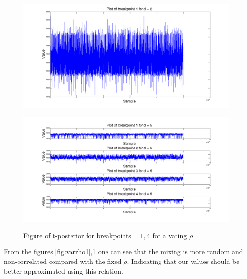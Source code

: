 \begin{figure}[H]

  \centering
\begin{minipage}{1\textwidth}
    \includegraphics[scale=0.28]{./Figures/varrho1.png}
  \label{fig:varrho1}
\end{minipage}

\begin{minipage}{1\textwidth}
    \includegraphics[scale=0.28]{./Figures/t4.png}
  \label{fig:varrho4}
\end{minipage}

  \caption[An Electron]{Figure of t-posterior for breakpoints$=1,4$ for a varing $\rho$}
\end{figure}

From the figures \ref{fig:varrho1},\ref{fig:varrho4} one can see that the mixing is more random and non-correlated compared with the fixed $\rho$. Indicating that our values should be better approximated using this relation.
